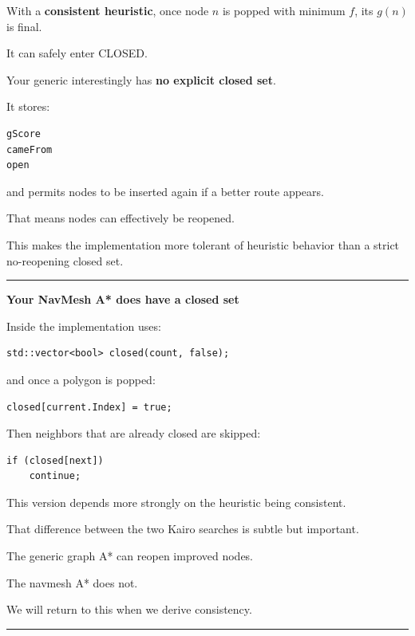 With a \textbf{consistent heuristic}, once node \(n\) is popped with minimum \(f\), its \(g(n)\) is final.

It can safely enter CLOSED.

Your generic  interestingly has \textbf{no explicit closed set}.

It stores:

\begin{verbatim}
gScore
cameFrom
open
\end{verbatim}

and permits nodes to be inserted again if a better route appears.

That means nodes can effectively be reopened.

This makes the implementation more tolerant of heuristic behavior than a strict no-reopening closed set.

\begin{center}\rule{0.5\linewidth}{0.5pt}\end{center}

\textbf{Your NavMesh A* does have a closed set}

Inside  the implementation uses:

\begin{verbatim}
std::vector<bool> closed(count, false);
\end{verbatim}

and once a polygon is popped:

\begin{verbatim}
closed[current.Index] = true;
\end{verbatim}

Then neighbors that are already closed are skipped:

\begin{verbatim}
if (closed[next])
    continue;
\end{verbatim}

This version depends more strongly on the heuristic being consistent.

That difference between the two Kairo searches is subtle but important.

The generic graph A* can reopen improved nodes.

The navmesh A* does not.

We will return to this when we derive consistency.

\begin{center}\rule{0.5\linewidth}{0.5pt}\end{center}

